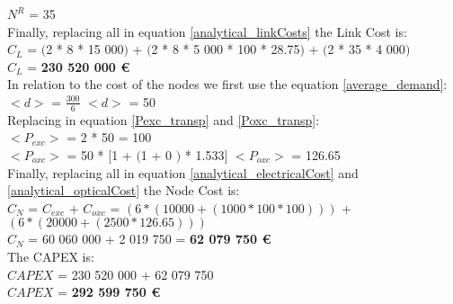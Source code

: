 $N^R$ = 35\\

Finally, replacing all in equation \ref{analytical_linkCosts} the Link Cost is:\\

$C_L$ = $($2 * 8 * 15 000$)$ + $($2 * 8 * 5 000 * 100 * 28.75$)$ + $($2 * 35 * 4 000$)$\\

$C_L$ = \textbf{230 520 000 \euro}\\

In relation to the cost of the nodes we first use the equation \ref{average_demand}:\\

$<d>$ = $\frac{300}{6}$ \qquad \qquad $<d>$ = 50\\

Replacing in equation \ref{Pexc_transp} and \ref{Poxc_transp}:\\

$<P_{exc}>$ = 2 * 50 = 100\\

$<P_{oxc}>$ = 50 * $[$1 + $($1 + $0$ $)$ * 1.533$]$ \qquad \quad $<P_{oxc}>$ = 126.65 \\

Finally, replacing all in equation \ref{analytical_electricalCost} and \ref{analytical_opticalCost} the Node Cost is:\\

$C_N$ = $C_{exc}$ + $C_{oxc}$ = $\left( 6*(10 000 + (1 000 * 100 * 100 ) ) \right)$ + $\left(6*(20 000 + (2 500 * 126.65 ) ) \right)$\\

$C_N$ = 60 060 000 + 2 019 750 = \textbf{62 079 750 \euro}\\

The CAPEX is:\\
$CAPEX$ = 230 520 000 + 62 079 750\\

$CAPEX$ = \textbf{292 599 750 \euro}\\

